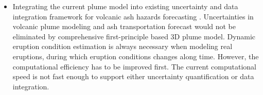\begin{itemize}
\item Integrating the current plume model into existing uncertainty and data integration framework for volcanic ash hazards forecasting \citep{patra2013challenges, madankan2014computation, stefanescu2014temporal}. Uncertainties in volcanic plume modeling and ash transportation forecast would not be eliminated by comprehensive first-principle based 3D plume model. Dynamic eruption condition estimation is always necessary when modeling real eruptions, during which eruption conditions changes along time. However, the computational efficiency has to be improved first. The current computational speed is not fast enough to support either uncertainty quantification or data integration.
\end{itemize}